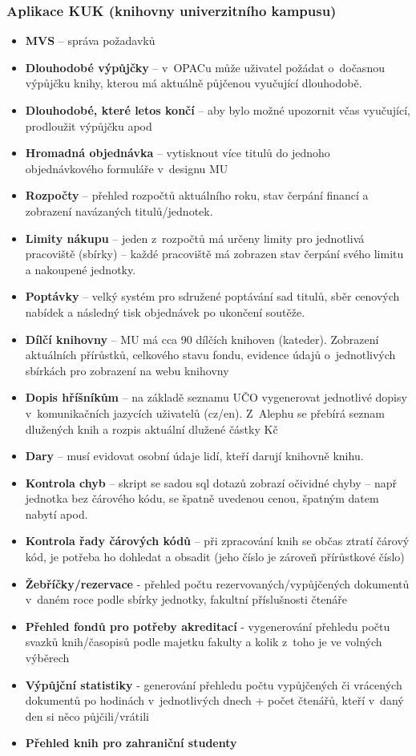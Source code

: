 \documentclass[
	11pt, oneside, printed, final, palatino, monochrome
	microtype,
	table,   %
	lof,     %
	lot     %
]{fithesis3}
\newcommand{\bold}[1]{\textbf{#1}}
\begin{document}
{\subsubsection{Aplikace KUK (knihovny univerzitního kampusu)}
\begin{itemize}
\item \bold{MVS} – správa požadavků
\item \bold{Dlouhodobé výpůjčky} – v~OPACu může uživatel požádat o~dočasnou výpůjčku knihy, kterou má aktuálně půjčenou vyučující dlouhodobě.
\item \bold{Dlouhodobé, které letos končí} – aby bylo možné upozornit včas vyučující, prodloužit výpůjčku apod
\item \bold{Hromadná objednávka} – vytisknout více titulů do jednoho objednávkového formuláře v~designu MU
\item \bold{Rozpočty} – přehled rozpočtů aktuálního roku, stav čerpání financí a zobrazení navázaných titulů/jednotek.
\item \bold{Limity nákupu} – jeden z~rozpočtů má určeny limity pro jednotlivá pracoviště (sbírky) – každé pracoviště má zobrazen stav čerpání svého limitu a nakoupené jednotky.
\item \bold{Poptávky} – velký systém pro sdružené poptávání sad titulů, sběr cenových nabídek a následný tisk objednávek po ukončení soutěže.
\item \bold{Dílčí knihovny} – MU má cca 90 dílčích knihoven (kateder). Zobrazení aktuálních přírůstků, celkového stavu fondu, evidence údajů o~jednotlivých sbírkách pro zobrazení na webu knihovny
\item \bold{Dopis hříšníkům} – na základě seznamu UČO vygenerovat jednotlivé dopisy v~komunikačních jazycích uživatelů (cz/en). Z~Alephu se přebírá seznam dlužených knih a rozpis aktuální dlužené částky Kč
\item \bold{Dary} – musí evidovat osobní údaje lidí, kteří darují knihovně knihu.
\item \bold{Kontrola chyb} – skript se sadou sql dotazů zobrazí očividné chyby – např jednotka bez čárového kódu, se špatně uvedenou cenou, špatným datem nabytí apod.
\item \bold{Kontrola řady čárových kódů} – při zpracování knih se občas ztratí čárový kód, je potřeba ho dohledat a obsadit (jeho číslo je zároveň přírůstkové číslo)
\item \bold{Žebříčky/rezervace} - přehled počtu rezervovaných/vypůjčených dokumentů v~daném roce podle sbírky jednotky, fakultní příslušnosti čtenáře
\item \bold{Přehled fondů pro potřeby akreditací} - vygenerování přehledu počtu svazků knih/časopisů podle majetku fakulty a kolik z~toho je ve volných výběrech
\item \bold{Výpůjční statistiky} - generování přehledu počtu vypůjčených či vrácených dokumentů po hodinách v~jednotlivých dnech + počet čtenářů, kteří v~daný den si něco půjčili/vrátili
\item \bold{Přehled knih pro zahraniční studenty}
\end{itemize}

}
\end{document}
